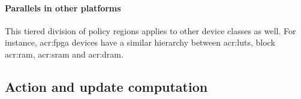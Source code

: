 \paragraph{Parallels in other platforms}
This tiered division of policy regions applies to other device classes as well.
For instance, \gls{acr:fpga} devices have a similar hierarchy between \glspl{acr:lut}, block \gls{acr:ram}, \gls{acr:sram} and \gls{acr:dram}.

\subsection{Action and update computation}\label{sec:action-and-update-computation}


